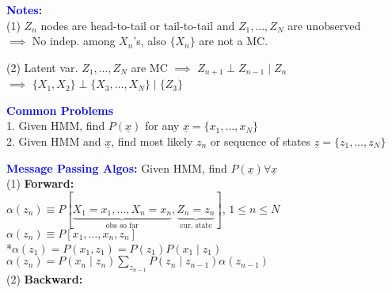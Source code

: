 \documentclass[5pt]{extarticle} %
\begin{document}
\begin{paracol}{3}
{    \textcolor{blue}{\textbf{Notes:}} \\
    (1) $Z_n$ nodes are head-to-tail or tail-to-tail and $Z_1,\ldots,Z_N$ are unobserved\\
    $\implies$ No indep. among $X_n$'s, also $\{X_n\}$ are not a MC.

    (2) Latent var. $Z_1,\ldots,Z_N$ are MC $\implies$ $Z_{n+1} \perp Z_{n-1} \mid Z_n$ \\
    $\implies$ $\{X_1,X_2\} \perp \{X_3,\ldots,X_N\} \mid \{Z_3\}$

    \textcolor{blue}{\textbf{Common Problems}} \\ 
    1. Given HMM, find $P(\underline{x})$ for any $\underline{x} = \{x_1,\ldots,x_N\}$ \\
    2. Given HMM and $\underline{x}$, find most likely $z_n$ or sequence of states $\underline{z} = \{z_1,\ldots,z_N\}$ 

    \textcolor{blue}{\textbf{Message Passing Algos:}} Given HMM, find $P(\underline{x}) \forall \underline{x}$ \\
    (1) \textbf{Forward:} \\
    $\alpha(z_n) \equiv P[\underbrace{X_1 = x_1,\ldots,X_n=x_n}_{\text{obs so far}}, \underbrace{Z_n = z_n}_{\text{cur. state}}]$, $1 \leq n \leq N$\\
    $\alpha(z_n) \equiv P[x_1,\ldots,x_n,z_n]$ \\
    *$\alpha(z_1) = P(x_1,z_1) = P(z_1)P(x_1 \mid z_1)$ \\
    $\boxed{\alpha(z_n) = P(x_n \mid z_n) \sum_{z_{n-1}} P(z_n \mid z_{n-1}) \alpha(z_{n-1})}$ \\
    (2) \textbf{Backward:} \\


    



    }
\end{paracol}
\end{document}
